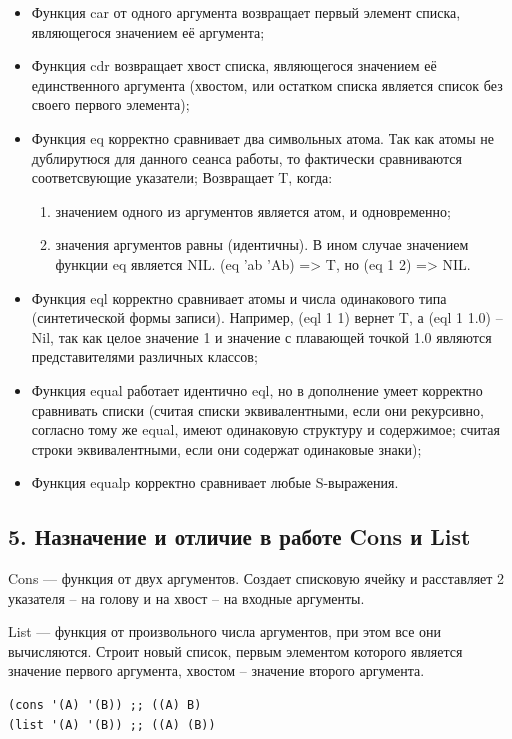\begin{itemize}
	\item Функция car от одного аргумента возвращает первый элемент списка, являющегося значением её аргумента;
	\item Функция cdr возвращает хвост списка, являющегося значением её единственного аргумента (хвостом, или остатком списка является список  без своего первого элемента);
	\item Функция eq корректно сравнивает два символьных атома. Так как атомы не дублирутюся для данного сеанса работы, то фактически сравниваются соответсвующие указатели;
	Возвращает T, когда: 
		\begin{enumerate}
			\item значением одного из аргументов является атом, и одновременно;
			\item значения аргументов равны (идентичны). В ином случае значением функции eq является NIL. (eq  'ab 'Ab) => T, но (eq 1 2) => NIL.
		\end{enumerate}
	\item Функция eql корректно сравнивает атомы и числа одинакового типа (синтетической формы записи). Например, (eql 1 1) вернет T, а (eql 1 1.0) -- Nil, так как целое значение 1 и значение с плавающей точкой 1.0 являются представителями различных классов;
	\item Функция equal работает идентично eql, но в дополнение умеет корректно сравнивать списки (считая списки эквивалентными, если они рекурсивно, согласно тому же equal, имеют одинаковую структуру и содержимое; считая строки эквивалентными, если они содержат одинаковые знаки);
	\item Функция equalp корректно сравнивает любые S-выражения. 
\end{itemize}

\subsection*{5. Назначение и отличие в работе Cons и List}

Cons --- функция от двух аргументов. Создает списковую ячейку и расставляет 2 указателя -- на голову и на хвост -- на входные аргументы.

List --- функция от произвольного числа аргументов, при этом все они вычисляются. Строит новый список, первым элементом которого является значение первого аргумента, хвостом -- значение второго аргумента.

\begin{lstlisting}
(cons '(A) '(B)) ;; ((A) B)
(list '(A) '(B)) ;; ((A) (B))
\end{lstlisting}

